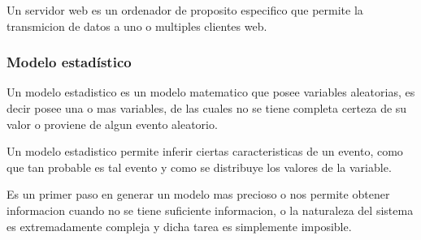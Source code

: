 Un servidor web es un ordenador de proposito especifico que permite la
transmicion de datos a uno o multiples clientes web.







\subsubsection{Modelo estadístico}

Un modelo estadistico es un modelo matematico que posee variables aleatorias,
es decir posee una o mas variables, de las cuales no se tiene completa certeza
de su valor o proviene de algun evento aleatorio.

Un modelo estadistico permite inferir ciertas caracteristicas de un evento,
como que tan probable es tal evento y como se distribuye los valores de la
variable.

Es un primer paso en generar un modelo mas precioso o nos permite obtener
informacion cuando no se tiene suficiente informacion, o la naturaleza del
sistema es extremadamente compleja y dicha tarea es simplemente imposible.

